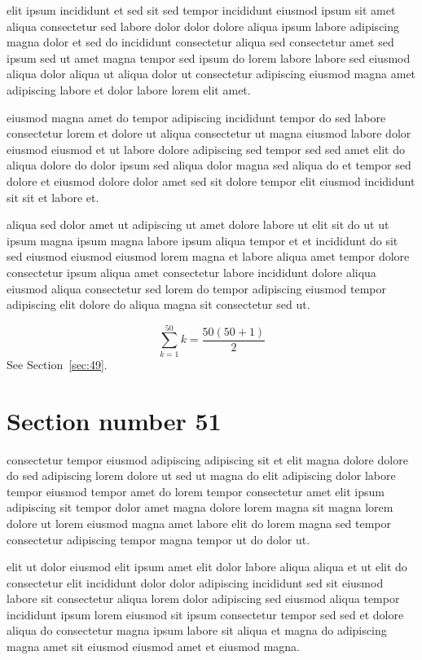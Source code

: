 \documentclass{article}
\begin{document}
elit ipsum incididunt et sed sit sed tempor incididunt eiusmod ipsum sit amet aliqua consectetur sed labore dolor dolor dolore aliqua ipsum labore adipiscing magna dolor et sed do incididunt consectetur aliqua sed consectetur amet sed ipsum sed ut amet magna tempor sed ipsum do lorem labore labore sed eiusmod aliqua dolor aliqua ut aliqua dolor ut consectetur adipiscing eiusmod magna amet adipiscing labore et dolor labore lorem elit amet.

eiusmod magna amet do tempor adipiscing incididunt tempor do sed labore consectetur lorem et dolore ut aliqua consectetur ut magna eiusmod labore dolor eiusmod eiusmod et ut labore dolore adipiscing sed tempor sed sed amet elit do aliqua dolore do dolor ipsum sed aliqua dolor magna sed aliqua do et tempor sed dolore et eiusmod dolore dolor amet sed sit dolore tempor elit eiusmod incididunt sit sit et labore et.

aliqua sed dolor amet ut adipiscing ut amet dolore labore ut elit sit do ut ut ipsum magna ipsum magna labore ipsum aliqua tempor et et incididunt do sit sed eiusmod eiusmod eiusmod lorem magna et labore aliqua amet tempor dolore consectetur ipsum aliqua amet consectetur labore incididunt dolore aliqua eiusmod aliqua consectetur sed lorem do tempor adipiscing eiusmod tempor adipiscing elit dolore do aliqua magna sit consectetur sed ut.

\begin{equation} \sum_{k=1}^{50} k = \frac{50(50+1)}{2} \end{equation}
See Section~\ref{sec:49}.

\section{Section number 51}\label{sec:51}
consectetur tempor eiusmod adipiscing adipiscing sit et elit magna dolore dolore do sed adipiscing lorem dolore ut sed ut magna do elit adipiscing dolor labore tempor eiusmod tempor amet do lorem tempor consectetur amet elit ipsum adipiscing sit tempor dolor amet magna dolore lorem magna sit magna lorem dolore ut lorem eiusmod magna amet labore elit do lorem magna sed tempor consectetur adipiscing tempor magna tempor ut do dolor ut.

elit ut dolor eiusmod elit ipsum amet elit dolor labore aliqua aliqua et ut elit do consectetur elit incididunt dolor dolor adipiscing incididunt sed sit eiusmod labore sit consectetur aliqua lorem dolor adipiscing sed eiusmod aliqua tempor incididunt ipsum lorem eiusmod sit ipsum consectetur tempor sed sed et dolore aliqua do consectetur magna ipsum labore sit aliqua et magna do adipiscing magna amet sit eiusmod eiusmod amet et eiusmod magna.
\end{document}
